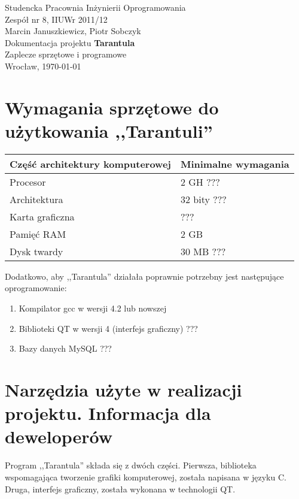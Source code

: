 \documentclass[11pt,leqno]{article}
\begin{document}

\begin{center}
\thispagestyle{empty}
{\Large Studencka Pracownia Inżynierii Oprogramowania}\\[0.5cm]
{\Large Zespół nr 8, IIUWr 2011/12}\\[2.5cm]

{Marcin Januszkiewicz, Piotr Sobczyk}\\[0.5cm]
{\huge Dokumentacja projektu \textbf{Tarantula}}\\[0.25cm]
{ Zaplecze sprzętowe i programowe}\\[0.5cm]
\vfill
{\large Wrocław, \today}
\end{center}

\newpage
\tableofcontents
\newpage


\section{Wymagania sprzętowe do użytkowania ,,Tarantuli''}

\begin{center}
 \begin{tabular}{|p{4cm}|p{3cm}|}
  \hline
 Część architektury komputerowej & Minimalne wymagania \\ \hline
  Procesor & 2 GH ??? \\ \hline
Architektura & 32 bity ??? \\ \hline
 Karta graficzna & ??? \\ \hline
Pamięć RAM & 2 GB \\ \hline
Dysk twardy & 30 MB ??? \\ \hline
 \end{tabular}
\end{center}

Dodatkowo, aby ,,Tarantula'' działała poprawnie potrzebny jest następujące oprogramowanie:
\begin{enumerate}
 \item Kompilator gcc w wersji 4.2 lub nowszej
  \item Biblioteki QT w wersji 4 (interfejs graficzny) ???
 \item Bazy danych MySQL ???
\end{enumerate}

\section{Narzędzia użyte w realizacji projektu. Informacja dla deweloperów}
Program ,,Tarantula'' składa się z dwóch części. Pierwsza, biblioteka wspomagająca tworzenie grafiki komputerowej,
została napisana w języku C. Druga, interfejs graficzny, została wykonana w technologii QT.
\end{document}
